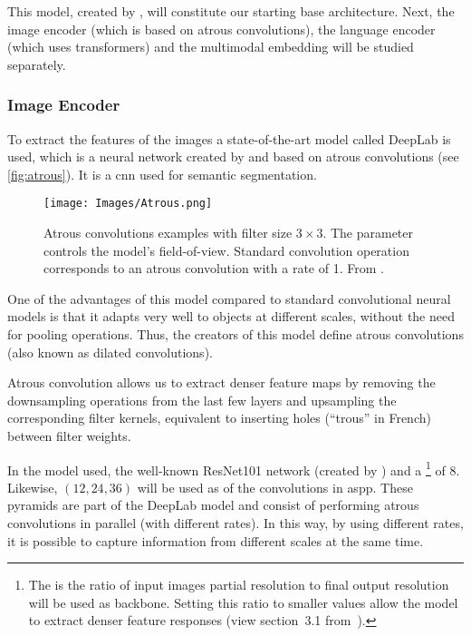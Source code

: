 This model, created by , will constitute our starting
base architecture. Next, the image encoder (which is based on atrous
convolutions), the language encoder (which uses transformers) and the
multimodal embedding will be studied separately.

\subsubsection{Image Encoder}

To extract the features of the images a state-of-the-art model called DeepLab
is used, which is a neural network created by  and based
on atrous convolutions (see \vref{fig:atrous}). It is a \gls{cnn} used for
semantic segmentation.

\begin{figure}[ht]
  \centering
  \texttt{[image: Images/Atrous.png]}
  \caption[Atrous convolutions examples]{Atrous convolutions examples with
    filter size \(3 \times 3\). The  parameter controls the model's
    field-of-view. Standard convolution operation corresponds to an atrous
    convolution with a rate of 1. From
    .}\label{fig:atrous}
\end{figure}

One of the advantages of this model compared to standard convolutional neural
models is that it adapts very well to objects at different scales, without the
need for pooling operations. Thus, the creators of this model define atrous
convolutions (also known as dilated convolutions).

\begin{quoteBox}
  Atrous convolution allows us to extract denser feature maps by removing the
  downsampling operations from the last few layers and upsampling the
  corresponding filter kernels, equivalent to inserting holes (``trous'' in
  French) between filter weights.
  \tcblower{}
\end{quoteBox}

In the model used, the well-known ResNet101 network (created by
) and a \footnote{The
   is the ratio of input images partial resolution to
  final output resolution will be used as backbone. Setting this ratio to
  smaller values allow the model to extract denser feature responses (view
  section~3.1 from~\cite{chen17:rethin}).} of 8. Likewise, \((12, 24, 36)\)
will be used as  of the convolutions in \gls{aspp}. These pyramids
are part of the DeepLab model and consist of performing atrous convolutions in
parallel (with different rates). In this way, by using different rates, it is
possible to capture information from different scales at the same time.

